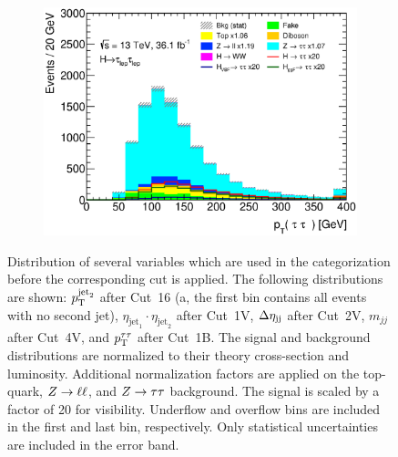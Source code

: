 \begin{figure}[htb]
\begin{subfigure}[t]{0.45\textwidth}
        \includegraphics[width=\textwidth]{./plots/event_selection/categories/ll-CutBoostedCatNoVBF-PtTauTau-lin.eps}
        \caption{}\label{fig:event_selection:cutflow:boosted:pttautau}
    \end{subfigure}
    \caption{Distribution of several variables which are used in the categorization before the corresponding cut is applied.
             The following distributions are shown: $p_\text{T}^{\text{jet}_2}$ after Cut~16 (a, the first bin contains all events with no second jet),
             $\eta_{\text{jet}_1} \cdot \eta_{\text{jet}_2}$ after Cut~1V, $\Delta \eta_\text{jj}$ after Cut~2V, $m_{jj}$ after Cut~4V, and $p_\text{T}^{\tau\tau}$ after Cut~1B.
             The signal and background distributions are normalized to their theory cross-section and luminosity.
             Additional normalization factors are applied on the top-quark, $Z \to \ell \ell$, and $Z \to \tau \tau$ background.
             The signal is scaled by a factor of 20 for visibility.
             Underflow and overflow bins are included in the first and last bin, respectively.
             Only statistical uncertainties are included in the error band.}\label{fig:event_selection:categories}
\end{figure}




